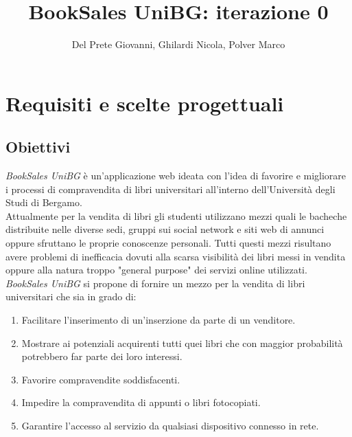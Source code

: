 \documentclass[10pt,a4paper]{report}
\author{Del Prete Giovanni, Ghilardi Nicola, Polver Marco}
\title{BookSales UniBG: iterazione 0}
\begin{document}
	
	\maketitle
	\tableofcontents
	
	\section{Requisiti e scelte progettuali}
	\subsection{Obiettivi}
	\textit{BookSales UniBG} è un'applicazione web ideata con l'idea di favorire e migliorare i processi di compravendita di libri universitari all'interno dell'Università degli Studi di Bergamo. 
	\\
	Attualmente per la vendita di libri gli studenti utilizzano mezzi quali le bacheche distribuite nelle diverse sedi, gruppi sui social network e siti web di annunci oppure sfruttano le proprie conoscenze personali. Tutti questi mezzi risultano avere problemi di inefficacia dovuti alla scarsa visibilità dei libri messi in vendita oppure alla natura troppo "general purpose" dei servizi online utilizzati.\\
	\textit{BookSales UniBG} si propone di fornire un mezzo per la vendita di libri universitari che sia in grado di:
	\begin{enumerate}
		\item Facilitare l'inserimento di un'inserzione da parte di un venditore.
		\item Mostrare ai potenziali acquirenti tutti quei libri che con maggior probabilità potrebbero far parte dei loro interessi.
		\item Favorire compravendite soddisfacenti.
		\item Impedire la compravendita di appunti o libri fotocopiati.
		\item Garantire l'accesso al servizio da qualsiasi dispositivo connesso in rete.
	\end{enumerate}
\end{document}
